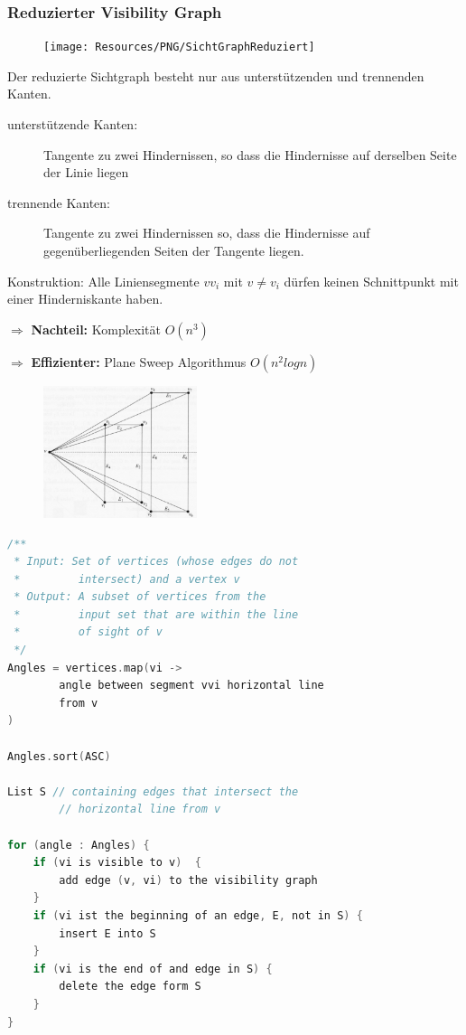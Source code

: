 \pagebreak
\subsubsection{Reduzierter Visibility Graph}
{
\begin{figure}
	\texttt{[image: Resources/PNG/SichtGraphReduziert]}
\end{figure}
Der reduzierte Sichtgraph besteht nur aus unterstützenden und trennenden Kanten.
\begin{description}
	\item[unterstützende Kanten:] Tangente zu zwei Hindernissen, so dass die
		Hindernisse auf derselben Seite der Linie liegen
	\item[trennende Kanten:] Tangente zu zwei Hindernissen so, dass die Hindernisse
		auf gegenüberliegenden Seiten der Tangente liegen.
\end{description}

Konstruktion:
Alle Liniensegmente $vv_i$ mit $v \neq v_i$ dürfen keinen Schnittpunkt mit
einer Hinderniskante haben.

$\Rightarrow$ \textbf{Nachteil:} Komplexität $O(n^3)$

$\Rightarrow$ \textbf{Effizienter:} Plane Sweep Algorithmus $O(n^2 log n)$

}
{
\begin{figure}
	\includegraphics[width=0.4\textwidth]{Resources/PNG/sweepLineAlgorithmus}
\end{figure}
\begin{lstlisting}[language=c, caption={Sweep Line Algorithmus}]
/**
 * Input: Set of vertices (whose edges do not
 *         intersect) and a vertex v
 * Output: A subset of vertices from the
 *         input set that are within the line
 *         of sight of v
 */
Angles = vertices.map(vi ->
		angle between segment vvi horizontal line
		from v
)

Angles.sort(ASC)

List S // containing edges that intersect the
        // horizontal line from v

for (angle : Angles) {
	if (vi is visible to v)  {
		add edge (v, vi) to the visibility graph
	}
	if (vi ist the beginning of an edge, E, not in S) {
		insert E into S
	}
	if (vi is the end of and edge in S) {
		delete the edge form S
	}
}
\end{lstlisting}

}

